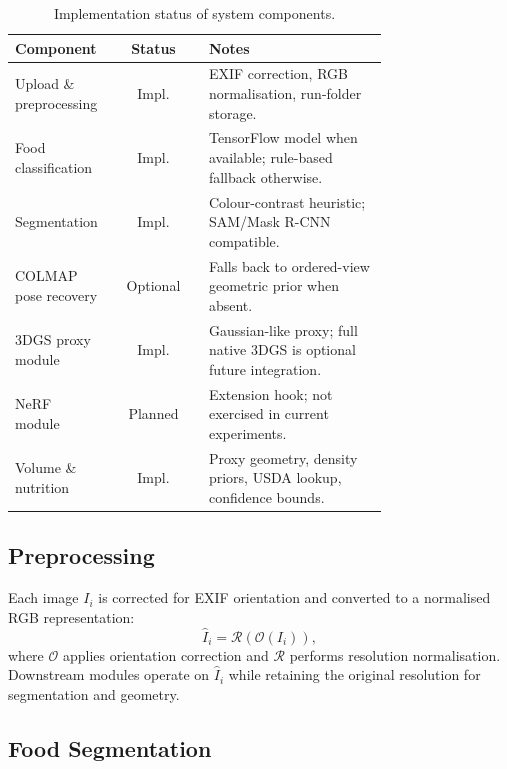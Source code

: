 \documentclass[conference]{IEEEtran}
\begin{document}
\begin{table}[t]
\centering
\caption{Implementation status of system components.}
\label{tab:impl_status}
\renewcommand{\arraystretch}{1.18}
\begin{tabular}{p{0.26\linewidth}cp{0.48\linewidth}}
\toprule
Component & Status & Notes \\
\midrule
Upload \& preprocessing & Impl. & EXIF correction, RGB normalisation, run-folder storage. \\
Food classification     & Impl. & TensorFlow model when available; rule-based fallback otherwise. \\
Segmentation            & Impl. & Colour-contrast heuristic; SAM/Mask R-CNN compatible. \\
COLMAP pose recovery    & Optional & Falls back to ordered-view geometric prior when absent. \\
3DGS proxy module       & Impl. & Gaussian-like proxy; full native 3DGS is optional future integration. \\
NeRF module             & Planned & Extension hook; not exercised in current experiments. \\
Volume \& nutrition     & Impl. & Proxy geometry, density priors, USDA lookup, confidence bounds. \\
\bottomrule
\end{tabular}
\end{table}

\subsection{Preprocessing}

Each image $I_i$ is corrected for EXIF orientation and converted to a
normalised RGB representation:
\begin{equation}
    \hat{I}_i = \mathcal{R}\!\left(\mathcal{O}(I_i)\right),
    \label{eq:preprocess}
\end{equation}
where $\mathcal{O}$ applies orientation correction and $\mathcal{R}$ performs
resolution normalisation. Downstream modules operate on $\hat{I}_i$ while
retaining the original resolution for segmentation and geometry.

\subsection{Food Segmentation}
\label{sec:segmentation}
\end{document}
